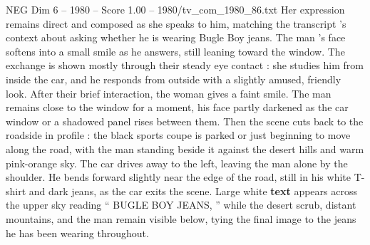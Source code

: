 \begin{textsample}{NEG Dim 6 – 1980 – Score 1.00 – 1980/tv\_com\_1980\_86.txt}
Her expression remains direct and composed as she speaks to him, matching the transcript ’s context about asking whether he is wearing Bugle Boy jeans.
The man ’s face softens into a small smile as he answers, still leaning toward the window.
The exchange is shown mostly through their steady eye contact : she studies him from inside the car, and he responds from outside with a slightly amused, friendly look.
After their brief interaction, the woman gives a faint smile.
The man remains close to the window for a moment, his face partly darkened as the car window or a shadowed panel rises between them.
Then the scene cuts back to the roadside in profile : the black sports coupe is parked or just beginning to move along the road, with the man standing beside it against the desert hills and warm pink-orange sky.
The car drives away to the left, leaving the man alone by the shoulder.
He bends forward slightly near the edge of the road, still in his white T-shirt and dark jeans, as the car exits the scene.
Large white \textbf{text} appears across the upper sky reading “ BUGLE BOY JEANS, ” while the desert scrub, distant mountains, and the man remain visible below, tying the final image to the jeans he has been wearing throughout.

\end{textsample}
